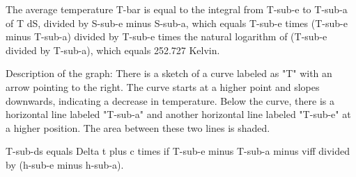The average temperature T-bar is equal to the integral from T-sub-e to T-sub-a of T dS, divided by S-sub-e minus S-sub-a, which equals T-sub-e times (T-sub-e minus T-sub-a) divided by T-sub-e times the natural logarithm of (T-sub-e divided by T-sub-a), which equals 252.727 Kelvin.

Description of the graph: There is a sketch of a curve labeled as "T" with an arrow pointing to the right. The curve starts at a higher point and slopes downwards, indicating a decrease in temperature. Below the curve, there is a horizontal line labeled "T-sub-a" and another horizontal line labeled "T-sub-e" at a higher position. The area between these two lines is shaded.

T-sub-ds equals Delta t plus c times if T-sub-e minus T-sub-a minus viff divided by (h-sub-e minus h-sub-a).